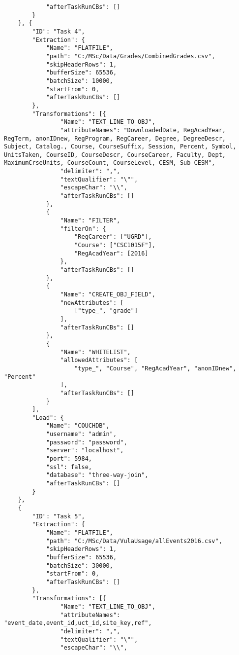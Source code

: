 \begin{verbatim}
            "afterTaskRunCBs": []
        }
    }, {
        "ID": "Task 4",
        "Extraction": {
            "Name": "FLATFILE",
            "path": "C:/MSc/Data/Grades/CombinedGrades.csv",
            "skipHeaderRows": 1,
            "bufferSize": 65536,
            "batchSize": 10000,
            "startFrom": 0,
            "afterTaskRunCBs": []
        },
        "Transformations": [{
                "Name": "TEXT_LINE_TO_OBJ",
                "attributeNames": "DownloadedDate, RegAcadYear, RegTerm, anonIDnew, RegProgram, RegCareer, Degree, DegreeDescr, Subject, Catalog., Course, CourseSuffix, Session, Percent, Symbol, UnitsTaken, CourseID, CourseDescr, CourseCareer, Faculty, Dept, MaximumCrseUnits, CourseCount, CourseLevel, CESM, Sub-CESM",
                "delimiter": ",",
                "textQualifier": "\"",
                "escapeChar": "\\",
                "afterTaskRunCBs": []
            },
            {
                "Name": "FILTER",
                "filterOn": {
                    "RegCareer": ["UGRD"],
                    "Course": ["CSC1015F"],
                    "RegAcadYear": [2016]
                },
                "afterTaskRunCBs": []
            },
            {
                "Name": "CREATE_OBJ_FIELD",
                "newAttributes": [
                    ["type_", "grade"]
                ],
                "afterTaskRunCBs": []
            },
            {
                "Name": "WHITELIST",
                "allowedAttributes": [
                    "type_", "Course", "RegAcadYear", "anonIDnew", "Percent"
                ],
                "afterTaskRunCBs": []
            }
        ],
        "Load": {
            "Name": "COUCHDB",
            "username": "admin",
            "password": "password",
            "server": "localhost",
            "port": 5984,
            "ssl": false,
            "database": "three-way-join",
            "afterTaskRunCBs": []
        }
    },
    {
        "ID": "Task 5",
        "Extraction": {
            "Name": "FLATFILE",
            "path": "C:/MSc/Data/VulaUsage/allEvents2016.csv",
            "skipHeaderRows": 1,
            "bufferSize": 65536,
            "batchSize": 30000,
            "startFrom": 0,
            "afterTaskRunCBs": []
        },
        "Transformations": [{
                "Name": "TEXT_LINE_TO_OBJ",
                "attributeNames": "event_date,event_id,uct_id,site_key,ref",
                "delimiter": ",",
                "textQualifier": "\"",
                "escapeChar": "\\",

\end{verbatim}

